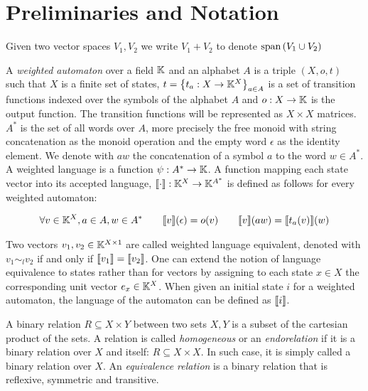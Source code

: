 \section{Preliminaries and Notation}
\label{sec:notation}

\begin{note}
  Given two vector spaces $V_1, V_2$ we write $V_1 + V_2$ to 
  denote $\text{span}\left(V_1 \cup V_2\right)$
\end{note}


\begin{defn}
  A \textit{weighted automaton} over a field $\mathbb{K}$ and an alphabet $A$ is a triple 
  $(X,o,t)$ such that $X$ is a finite set of states, 
  $t = \left\lbrace t_a : X \to \mathbb{K}^X\right\rbrace_{a \in A}$
  is a set of transition functions indexed over the symbols of the alphabet $A$ and 
  $o : X  \to \mathbb{K}$ is the output function. 
  The transition functions will be represented as $X \times X$ matrices.
  $A^*$ is the set of all words over $A$, more precisely the free monoid
  with string concatenation as the monoid operation and the empty word $\epsilon$ 
  as the identity element. We denote with $aw$ the
  concatenation of a symbol $a$ to the word $w \in A^*$.
  A weighted language is a function $\psi: A^* \to \mathbb{K}$.
  A function mapping each state vector into its 
  accepted language, $\llbracket\cdot\rrbracket: \mathbb{K}^X \to \mathbb{K}^{A^*}$ is defined as follows for 
  every weighted automaton:

  \begin{equation*}
    \begin{aligned}
      \forall v \in \mathbb{K}^X, a \in A, w \in A^* \quad \quad
      \llbracket v\rrbracket(\epsilon) = o(v) \quad \quad
      \llbracket v\rrbracket(aw) = \llbracket t_a(v)\rrbracket(w)  
    \end{aligned}
  \end{equation*}
\end{defn}

Two vectors $v_1, v_2 \in \mathbb{K}^{X\times 1}$ are called weighted language equivalent, 
denoted with  $v_1 \sim_l v_2 $ if and only if 
$ \llbracket v_1\rrbracket = \llbracket v_2\rrbracket$. One can extend the notion of language 
equivalence to states rather than for vectors by assigning 
to each state $x \in X$ the corresponding  unit vector 
$e_x \in \mathbb{K}^X$. When given an initial state $i$ for a weighted automaton, 
the language  of the automaton can be defined as $\llbracket i\rrbracket$.


\begin{defn}
  A binary relation $R \subseteq X \times Y$ between two sets $X, Y$ is a 
  subset of the 
  cartesian product of the sets. A relation is called \textit{homogeneous} 
  or an \textit
  {endorelation} if it is a binary relation over $X$ and itself: 
  $R \subseteq X \times
   X$. 
  In such case, it is simply called a binary relation over $X$.
  An \textit{equivalence relation} is a binary relation that is reflexive, 
  symmetric and
  transitive. 
\end{defn}


